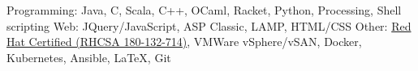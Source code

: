 \begin{cvskills}
    \cvskill
    {Programming:}
    {Java, C, Scala, C++, OCaml, Racket, Python, Processing, Shell scripting}
	\cvskill
	{Web:}
	{JQuery/JavaScript, ASP Classic, LAMP, HTML/CSS}
	\cvskill
	{Other:}
    {\href{https://www.redhat.com/rhtapps/services/verify/?certId=180-132-714}{Red Hat Certified (RHCSA 180-132-714)}, VMWare vSphere/vSAN, Docker, Kubernetes, Ansible, LaTeX, Git}
	\vspace{-1.5em} %
\end{cvskills}
